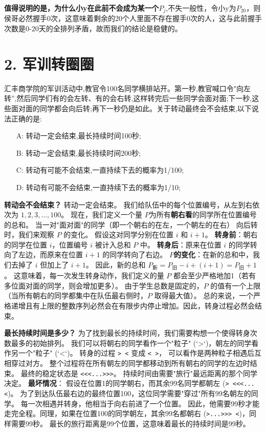 \documentclass[UTF8]{ctexart}
\begin{document}
\textbf{值得说明的是，为什么小y在此前不会成为某一个$P_{j}$},不失一般性，令小y为$P_{20}$，则侯哥必然握手0次，这意味着剩余的20个人里面不存在握手0次的人，这与此前握手次数是0-20天的全排列矛盾，故而我们的结论是稳健的。

\section*{2. 军训转圈圈}

汇丰商学院的军训活动中,教官令100名同学横排站开。第一秒,教官喊口令"向左转”,然后同学们有的会左转、有的会右转,这样转完后一些同学会面对面;下一秒,这些面对面的同学都会向后转;再下一秒仍是如此。关于转动最终会不会结束,以下说法正确的是:
\begin{itemize}
    \item[A:] 转动一定会结束,最长持续时间100秒;
    \item[B:] 转动一定会结束,最长持续时间200秒;
    \item[C:] 转动有可能不会结束,一直持续下去的概率为1/100;
    \item[D:] 转动有可能不会结束,一直持续下去的概率为1/10;
\end{itemize}



\textbf{转动会不会结束？} 转动一定会结束。
我们给队伍中的每个位置编号，从左到右依次为 $1, 2, 3, \dots, 100$。
现在，我们定义一个量 $P$为所有\textbf{朝右看}的同学所在位置编号的总和。
当一对"面对面"的同学（即一个朝右的在左，一个朝左的在右）
向后转时，我们来观察 $P$ 的变化。
假设这对同学分别在位置 $i$ 和 $i+1$。
\textbf{转身前}：朝右的同学在位置 $i$，位置编号 $i$ 被计入总和 $P$ 中。
\textbf{转身后}：原来在位置 $i$ 的同学转向了左边，而原来在位置 $i+1$ 的同学转向了右边。
\textbf{$P$的变化}：在新的总和中，我们去掉了 $i$ 但加上了 $i+1$。
因此，新的总和 $P_{\text{新}} = P_{\text{旧}} - i + (i+1) = P_{\text{旧}} + 1$。
这意味着，每一次发生转身动作，我们定义的量 $P$ 都会至少严格地加1（若有多位面对面的同学，则会增加更多）。
由于学生总数是固定的，$P$ 的值有一个上限（当所有朝右的同学都集中在队伍最右侧时，$P$ 取得最大值）。
总的来说，一个严格递增且有上限的整数序列必然会在有限步内停止增加。因此，转身过程必然会结束。

\textbf{最长持续时间是多少？} 为了找到最长的持续时间，我们需要构想一个使得转身次数最多的初始排列。
我们可以将朝右的同学看作一个"粒子" (`>`)，朝左的同学看作另一个"粒子" (`<`)。
转身的过程 \texttt{> <} 变成 \texttt{< >}，
可以看作是两种粒子相遇后互相穿过对方。
整个过程将在所有朝左的同学都移动到所有朝右的同学的左边时结束。
最终的稳定状态是 \texttt{<<<...>>>}。
持续时间由需要"旅行"最远距离的那个同学决定。
\textbf{最坏情况}：
假设在位置1的同学朝右，而其余99名同学都朝左 (\texttt{> <<<...<})。
为了到达队伍最右边的最终位置100，这位同学需要"穿过"所有99名朝左的同学。
每一次相遇并转身，他相当于向右前进了一个位置。
因此，他需要99秒才能走完全程。同理，如果在位置100的同学朝左，其余99名都朝右 (\texttt{>...>>> <})，同样需要99秒。
最长的旅行距离是99个位置，这意味着最长的持续时间是99秒。
\end{document}
